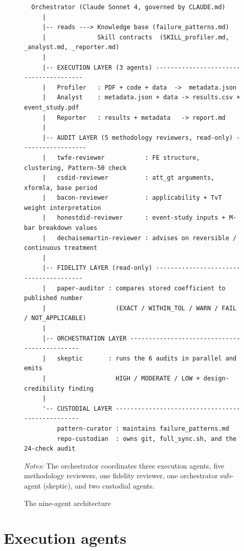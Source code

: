 \begin{figure}[H]
\centering
\begin{tcolorbox}[colback=gray!5, colframe=gray!60, width=\textwidth, title=Nine-agent architecture]
\footnotesize
\begin{verbatim}
  Orchestrator (Claude Sonnet 4, governed by CLAUDE.md)
     |
     |-- reads ---> Knowledge base (failure_patterns.md)
     |              Skill contracts  (SKILL_profiler.md, _analyst.md, _reporter.md)
     |
     |-- EXECUTION LAYER (3 agents) ---------------------------------------
     |   Profiler   : PDF + code + data  ->  metadata.json
     |   Analyst    : metadata.json + data -> results.csv + event_study.pdf
     |   Reporter   : results + metadata   -> report.md
     |
     |-- AUDIT LAYER (5 methodology reviewers, read-only) ------------------
     |   twfe-reviewer           : FE structure, clustering, Pattern-50 check
     |   csdid-reviewer          : att_gt arguments, xformla, base period
     |   bacon-reviewer          : applicability + TvT weight interpretation
     |   honestdid-reviewer      : event-study inputs + M-bar breakdown values
     |   dechaisemartin-reviewer : advises on reversible / continuous treatment
     |
     |-- FIDELITY LAYER (read-only) ---------------------------------------
     |   paper-auditor : compares stored coefficient to published number
     |                   (EXACT / WITHIN_TOL / WARN / FAIL / NOT_APPLICABLE)
     |
     |-- ORCHESTRATION LAYER ---------------------------------------------
     |   skeptic       : runs the 6 audits in parallel and emits
     |                   HIGH / MODERATE / LOW + design-credibility finding
     |
     '-- CUSTODIAL LAYER -------------------------------------------------
         pattern-curator : maintains failure_patterns.md
         repo-custodian  : owns git, full_sync.sh, and the 24-check audit
\end{verbatim}
\end{tcolorbox}
\caption{The nine-agent architecture}
\label{fig:pipeline_arch}
\vspace{4pt}
{\footnotesize\textit{Notes:} The orchestrator coordinates three execution agents, five methodology reviewers, one fidelity reviewer, one orchestrator sub-agent (skeptic), and two custodial agents.\par}
\end{figure}


\section{Execution agents}
\label{sec:appc_execution}

